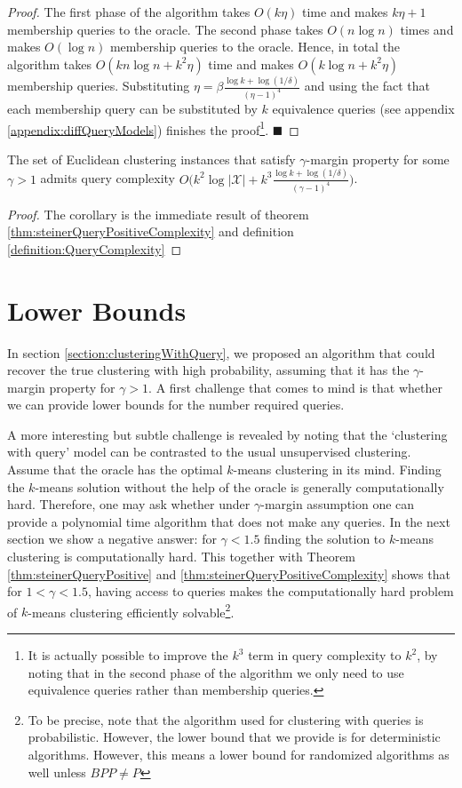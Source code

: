 \documentclass[orivec]{llncs}
\newcommand{\mc}{\mathcal}
\renewcommand{\qed}{\hfill\ensuremath{\blacksquare}}
\begin{document}
\begin{proof}
The first phase of the algorithm takes $O(k\eta)$ time and makes $k\eta+1$ membership queries to the oracle. The second phase takes $O(n\log n)$ times and makes $O(\log n)$ membership queries to the oracle. Hence, in total the algorithm takes $O(kn\log n + k^2\eta)$ time and makes $O(k\log n + k^2\eta)$ membership queries. Substituting $\eta = \beta\frac{\log k + \log(1/\delta)}{(\eta-1)^4}$ and using the fact that each membership query can be substituted by $k$ equivalence queries (see appendix \ref{appendix:diffQueryModels}) finishes the proof\footnote{It is actually possible to improve the $k^3$ term in query complexity to $k^2$, by noting that in the second phase of the algorithm we only need to use equivalence queries rather than membership queries.}.
\qed
\end{proof}

\begin{corollary}
The set of Euclidean clustering instances that satisfy $\gamma$-margin property for some $\gamma > 1$ admits query complexity $O\big(k^2\log |\mc X| + k^3\frac{\log k + \log (1/\delta)}{(\gamma - 1)^4}\big)$. 
\begin{proof}
The corollary is the immediate result of theorem \ref{thm:steinerQueryPositiveComplexity} and definition \ref{definition:QueryComplexity}
\end{proof}

\end{corollary}

\section{Lower Bounds}
\label{section:lowerBounds}
In section \ref{section:clusteringWithQuery}, we proposed an algorithm that could recover the true clustering with high probability, assuming that it has the $\gamma$-margin property for $\gamma>1$. A first challenge that comes to mind is that whether we can provide lower bounds for the number required queries.

A more interesting but subtle challenge is revealed by noting that the `clustering with query' model can be contrasted to the usual unsupervised clustering. Assume that the oracle has the optimal $k$-means clustering in its mind. Finding the $k$-means solution without the help of the oracle is generally computationally hard. Therefore, one may ask whether under $\gamma$-margin assumption one can provide a polynomial time algorithm that does not make any queries. In the next section we show a negative answer: for $\gamma < 1.5$ finding the solution to $k$-means clustering is computationally hard. This together with Theorem \ref{thm:steinerQueryPositive} and \ref{thm:steinerQueryPositiveComplexity} shows that for $1<\gamma<1.5$, having access to queries makes the computationally hard problem of $k$-means clustering efficiently solvable\footnote{To be precise, note that the algorithm used for clustering with queries is probabilistic. However, the lower bound that we provide is for deterministic algorithms. However, this means a lower bound for randomized algorithms as well unless $BPP\neq P$}.
\end{document}
